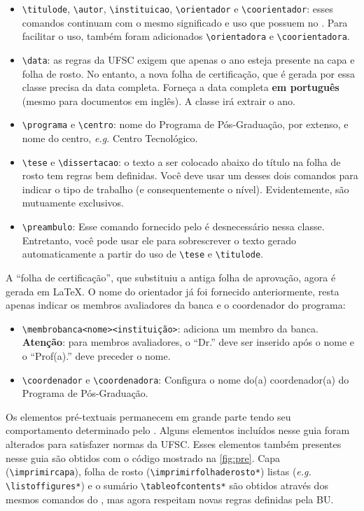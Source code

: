 \documentclass[embeddedlogo]{../ufsc-thesis-rn46-2019}
\newcommand{\lacmd}[1]{\texttt{\textbackslash{}#1}}
\begin{document}
\begin{itemize}
  \item \lacmd{titulode}, \lacmd{autor}, \lacmd{instituicao}, \lacmd{orientador}
e \lacmd{coorientador}: esses comandos continuam com o mesmo significado e uso
que possuem no \abnTeX. Para facilitar o uso, também foram adicionados
\lacmd{orientadora} e \lacmd{coorientadora}.
  \item \lacmd{data}: as regras da UFSC exigem que apenas o ano esteja presente
na capa e folha de rosto. No entanto, a nova folha de certificação, que é gerada
por essa classe precisa da data completa. Forneça a data completa \textbf{em
português} (mesmo para documentos em inglês). A classe irá extrair o ano.
  \item \lacmd{programa} e \lacmd{centro}: nome do Programa de Pós-Graduação,
por extenso, e nome do centro, \emph{e.g.}  Centro Tecnológico.
  \item \lacmd{tese} e \lacmd{dissertacao}: o texto a ser colocado abaixo do
título na folha de rosto tem regras bem definidas. Você deve usar um desses dois
comandos para indicar o tipo de trabalho (e consequentemente o nível).
Evidentemente, são mutuamente exclusivos.
  \item \lacmd{preambulo}: Esse comando fornecido pelo \abnTeX{} é desnecessário
nessa classe. Entretanto, você pode usar ele para sobrescrever o texto gerado
automaticamente a partir do uso de \lacmd{tese} e \lacmd{titulode}.
\end{itemize}

A ``folha de certificação'', que substituiu a antiga folha de aprovação, agora
é gerada em \LaTeX. O nome do orientador já foi fornecido anteriormente, resta
apenas indicar os membros avaliadores da banca e o coordenador do programa:
\begin{itemize}
  \item \lacmd{membrobanca{<nome>}{<instituição>}}: adiciona um membro da banca.
\textbf{Atenção}: para membros avaliadores, o ``Dr.'' deve ser inserido após o
nome e o ``Prof(a).'' deve preceder o nome.
  \item \lacmd{coordenador} e \lacmd{coordenadora}: Configura o nome do(a)
coordenador(a) do Programa de Pós-Graduação.
\end{itemize}

Os elementos pré-textuais permanecem em grande parte tendo seu comportamento
determinado pelo \abnTeX. Alguns elementos incluídos nesse guia foram alterados
para satisfazer normas da UFSC. Esses elementos também presentes nesse guia são
obtidos com o código mostrado na \autoref{fig:pre}. Capa (\lacmd{imprimircapa}),
folha de rosto (\lacmd{imprimirfolhaderosto*}) listas (\emph{e.g.}
\lacmd{listoffigures*}) e o sumário \lacmd{tableofcontents*} são obtidos através
dos mesmos comandos do \abnTeX, mas agora respeitam novas regras definidas pela
BU.
\end{document}
